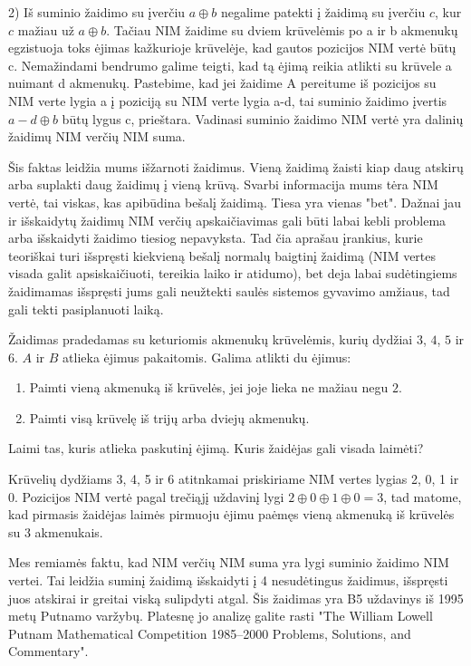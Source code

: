 2) Iš suminio žaidimo su įverčiu $a\oplus b$ negalime patekti į žaidimą su
įverčiu $c$, kur $c$ mažiau už $a\oplus b$. Tačiau NIM žaidime su dviem krūvelėmis po a ir
b akmenukų egzistuoja toks ėjimas kažkurioje krūvelėje, kad gautos pozicijos
NIM vertė būtų c. Nemažindami bendrumo galime teigti, kad
tą ėjimą reikia atlikti su krūvele a nuimant d akmenukų. Pastebime, kad jei
žaidime A pereitume iš pozicijos su NIM verte lygia a į poziciją su NIM verte
lygia a-d, tai suminio žaidimo įvertis  $a-d\oplus b$ būtų lygus c, prieštara.
Vadinasi suminio žaidimo NIM vertė yra dalinių žaidimų NIM verčių NIM suma.

Šis faktas leidžia mums išžarnoti žaidimus. Vieną žaidimą žaisti kiap daug
atskirų arba suplakti daug žaidimų į vieną krūvą. Svarbi informacija mums tėra
NIM vertė, tai viskas, kas apibūdina bešalį žaidimą. Tiesa yra vienas "bet".
Dažnai jau ir išskaidytų žaidimų NIM verčių apskaičiavimas gali būti labai
kebli problema arba išskaidyti žaidimo tiesiog nepavyksta. Tad čia aprašau
įrankius, kurie teoriškai turi išspręsti kiekvieną bešalį normalų baigtinį žaidimą (NIM vertes
visada galit apsiskaičiuoti, tereikia laiko ir atidumo), bet deja labai
sudėtingiems žaidimamas išspręsti jums gali neužtekti saulės sistemos gyvavimo
amžiaus, tad gali tekti pasiplanuoti laiką. 

\begin{pavnr}
  Žaidimas pradedamas su keturiomis akmenukų krūvelėmis, kurių dydžiai $3$,
  $4$, $5$ ir $6$. $A$ ir $B$ atlieka ėjimus pakaitomis. Galima atlikti du
  ėjimus:
  \begin{enumerate}
    \item Paimti vieną akmenuką iš krūvelės, jei joje lieka ne mažiau negu $2$.
    \item Paimti visą krūvelę iš trijų arba dviejų akmenukų.
  \end{enumerate}
  Laimi tas, kuris atlieka paskutinį ėjimą. Kuris žaidėjas gali visada laimėti?
\end{pavnr}

Krūvelių dydžiams 3, 4, 5 ir 6 atitnkamai priskiriame NIM vertes lygias 2, 0, 1
ir 0. Pozicijos NIM vertė pagal trečiąjį uždavinį lygi $2\oplus 0\oplus
1\oplus 0=3$, tad matome, kad pirmasis žaidėjas laimės pirmuoju ėjimu paėmęs
vieną akmenuką iš krūvelės su 3 akmenukais. 

\begin{pastaba}
  Mes remiamės faktu, kad NIM verčių NIM suma yra lygi suminio žaidimo NIM
  vertei. Tai leidžia suminį žaidimą išskaidyti į 4 nesudėtingus
  žaidimus, išspręsti juos atskirai ir greitai viską sulipdyti atgal. Šis
  žaidimas yra B5 uždavinys iš 1995 metų Putnamo varžybų. Platesnę jo analizę galite rasti "The William Lowell Putnam
  Mathematical Competition 1985–2000 Problems, Solutions, and Commentary".
\end{pastaba}

